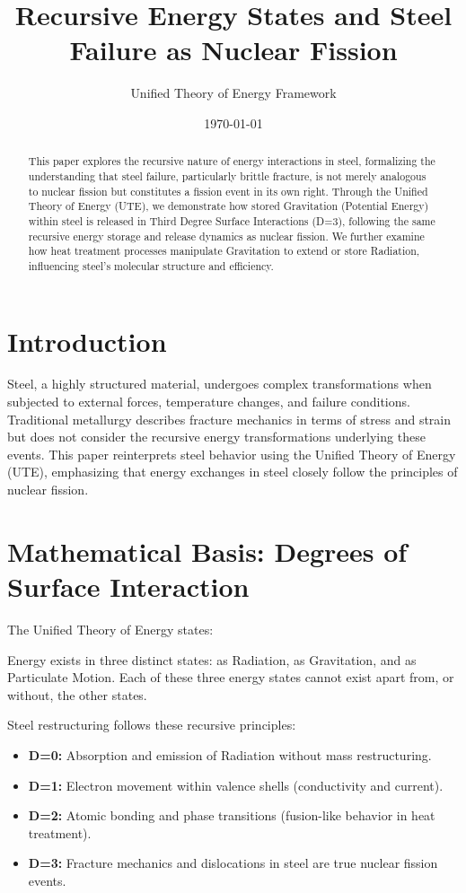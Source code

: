 \documentclass{article}
\title{Recursive Energy States and Steel Failure as Nuclear Fission}
\author{Unified Theory of Energy Framework}
\date{\today}
\begin{document}
\maketitle

\begin{abstract}
This paper explores the recursive nature of energy interactions in steel, formalizing the understanding that steel failure, particularly brittle fracture, is not merely analogous to nuclear fission but constitutes a fission event in its own right. Through the Unified Theory of Energy (UTE), we demonstrate how stored Gravitation (Potential Energy) within steel is released in Third Degree Surface Interactions (D=3), following the same recursive energy storage and release dynamics as nuclear fission. We further examine how heat treatment processes manipulate Gravitation to extend or store Radiation, influencing steel's molecular structure and efficiency.
\end{abstract}

\section{Introduction}
Steel, a highly structured material, undergoes complex transformations when subjected to external forces, temperature changes, and failure conditions. Traditional metallurgy describes fracture mechanics in terms of stress and strain but does not consider the recursive energy transformations underlying these events. This paper reinterprets steel behavior using the Unified Theory of Energy (UTE), emphasizing that energy exchanges in steel closely follow the principles of nuclear fission.

\section{Mathematical Basis: Degrees of Surface Interaction}

The Unified Theory of Energy states:
\begin{theorem}
Energy exists in three distinct states: as Radiation, as Gravitation, and as Particulate Motion. Each of these three energy states cannot exist apart from, or without, the other states.
\end{theorem}

Steel restructuring follows these recursive principles:
\begin{itemize}
    \item \textbf{D=0:} Absorption and emission of Radiation without mass restructuring.
    \item \textbf{D=1:} Electron movement within valence shells (conductivity and current).
    \item \textbf{D=2:} Atomic bonding and phase transitions (fusion-like behavior in heat treatment).
    \item \textbf{D=3:} Fracture mechanics and dislocations in steel are true nuclear fission events.
\end{itemize}
\end{document}

